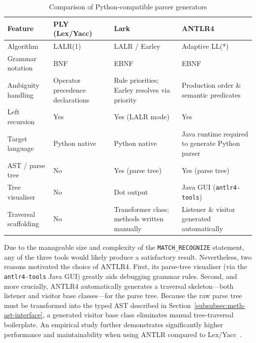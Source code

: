 \begin{table}[htbp]
  \centering
  \small
  \caption{Comparison of Python-compatible parser generators}
  \label{tab:parser-gen-comparison}
  \begin{tabular}{p{2.8cm} p{3.0cm} p{3.0cm} p{3.0cm}}
    \toprule
    \textbf{Feature}
      & \textbf{PLY (Lex/Yacc)}
      & \textbf{Lark}
      & \textbf{ANTLR4} \\
    \midrule
    Algorithm
      & LALR(1)
      & LALR / Earley
      & Adaptive LL(*) \cite{parr2014adaptive} \\[4pt]
    Grammar notation
      & BNF
      & EBNF
      & EBNF \\[4pt]
    Ambiguity handling
      & Operator precedence declarations
      & Rule priorities; Earley resolves via priority
      & Production order \& semantic predicates \\[4pt]
    Left recursion
      & Yes
      & Yes (LALR mode)
      & Yes \\[4pt]
    Target language
      & Python native
      & Python native
      & Java runtime required to generate Python parser \\[4pt]
    AST / parse tree
      & No
      & Yes (parse tree)
      & Yes (parse tree) \\[4pt]
    Tree visualiser
      & No
      & Dot output
      & Java GUI (\texttt{antlr4-tools}) \\[4pt]
    Traversal scaffolding
      & No
      & Transformer class; methods written manually
      & Listener \& visitor generated automatically \\
    \bottomrule
  \end{tabular}
\end{table}

Due to the manageable size and complexity of the
\texttt{MATCH\_RECOGNIZE} statement, any of the three tools would
likely produce a satisfactory result.  Nevertheless, two reasons
motivated the choice of ANTLR4.  First, its parse-tree visualiser
(via the \texttt{antlr4-tools} Java GUI) greatly aids debugging
grammar rules.  Second, and more crucially, ANTLR4 automatically
generates a traversal skeleton---both listener and visitor base
classes---for the parse tree.  Because the raw parse tree must be
transformed into the typed AST described in
Section~\ref{subsubsec:meth-ast-interface}, a generated visitor
base class eliminates manual tree-traversal boilerplate.  An
empirical study further demonstrates significantly higher
performance and maintainability when using ANTLR compared to
Lex/Yacc~\cite{antlr_performance}.


